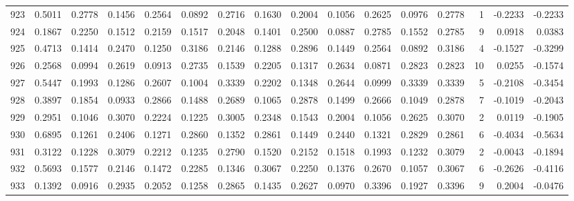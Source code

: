 \begin{tabular}{lrrrrrrrrrrrrrrr}
923 &      0.5011 &  0.2778 &  0.1456 &  0.2564 &  0.0892 &  0.2716 &  0.1630 &  0.2004 &  0.1056 &  0.2625 &   0.0976 &     0.2778 &      1 &                   -0.2233 &                    -0.2233 \\
924 &      0.1867 &  0.2250 &  0.1512 &  0.2159 &  0.1517 &  0.2048 &  0.1401 &  0.2500 &  0.0887 &  0.2785 &   0.1552 &     0.2785 &      9 &                    0.0918 &                     0.0383 \\
925 &      0.4713 &  0.1414 &  0.2470 &  0.1250 &  0.3186 &  0.2146 &  0.1288 &  0.2896 &  0.1449 &  0.2564 &   0.0892 &     0.3186 &      4 &                   -0.1527 &                    -0.3299 \\
926 &      0.2568 &  0.0994 &  0.2619 &  0.0913 &  0.2735 &  0.1539 &  0.2205 &  0.1317 &  0.2634 &  0.0871 &   0.2823 &     0.2823 &     10 &                    0.0255 &                    -0.1574 \\
927 &      0.5447 &  0.1993 &  0.1286 &  0.2607 &  0.1004 &  0.3339 &  0.2202 &  0.1348 &  0.2644 &  0.0999 &   0.3339 &     0.3339 &      5 &                   -0.2108 &                    -0.3454 \\
928 &      0.3897 &  0.1854 &  0.0933 &  0.2866 &  0.1488 &  0.2689 &  0.1065 &  0.2878 &  0.1499 &  0.2666 &   0.1049 &     0.2878 &      7 &                   -0.1019 &                    -0.2043 \\
929 &      0.2951 &  0.1046 &  0.3070 &  0.2224 &  0.1225 &  0.3005 &  0.2348 &  0.1543 &  0.2004 &  0.1056 &   0.2625 &     0.3070 &      2 &                    0.0119 &                    -0.1905 \\
930 &      0.6895 &  0.1261 &  0.2406 &  0.1271 &  0.2860 &  0.1352 &  0.2861 &  0.1449 &  0.2440 &  0.1321 &   0.2829 &     0.2861 &      6 &                   -0.4034 &                    -0.5634 \\
931 &      0.3122 &  0.1228 &  0.3079 &  0.2212 &  0.1235 &  0.2790 &  0.1520 &  0.2152 &  0.1518 &  0.1993 &   0.1232 &     0.3079 &      2 &                   -0.0043 &                    -0.1894 \\
932 &      0.5693 &  0.1577 &  0.2146 &  0.1472 &  0.2285 &  0.1346 &  0.3067 &  0.2250 &  0.1376 &  0.2670 &   0.1057 &     0.3067 &      6 &                   -0.2626 &                    -0.4116 \\
933 &      0.1392 &  0.0916 &  0.2935 &  0.2052 &  0.1258 &  0.2865 &  0.1435 &  0.2627 &  0.0970 &  0.3396 &   0.1927 &     0.3396 &      9 &                    0.2004 &                    -0.0476 \\

\end{tabular}
